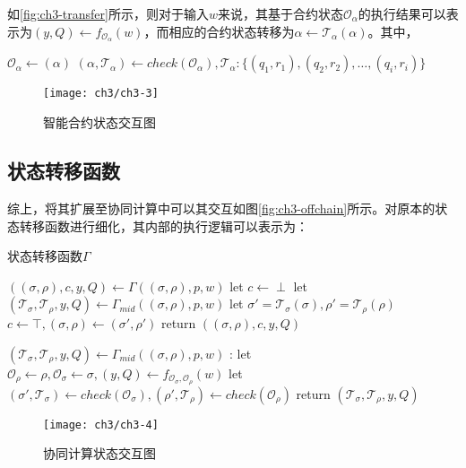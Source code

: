如\autoref{fig:ch3-transfer}所示，则对于输入$w$来说，其基于合约状态$\mathcal{O}_{\alpha}$的执行结果可以表示为$(y, Q) \leftarrow f_{\mathcal{O}_\alpha}(w)$，而相应的合约状态转移为$\alpha \leftarrow \mathcal{T}_\alpha(\alpha)$。其中，
\begin{center}
    $\mathcal{O}_{\alpha} \leftarrow (\alpha)$ \newline
    $(\alpha, \mathcal{T}_\alpha) \leftarrow check(\mathcal{O}_{\alpha}), \mathcal{T}_\alpha: \{(q_1, r_1), (q_2, r_2), \dots, (q_i, r_i)\}$
\end{center}
\begin{figure}[htbp]
    \centering
    \texttt{[image: ch3/ch3-3]}
    \caption{\label{fig:ch3-transfer}智能合约状态交互图}
\end{figure}
\subsection{状态转移函数}
综上，将其扩展至协同计算中可以其交互如图\autoref{fig:ch3-offchain}所示。对原本的状态转移函数进行细化，其内部的执行逻辑可以表示为：
\begin{breakablealgorithm}
    \caption{状态转移函数$\Gamma$}
    \label{alg:ch3-2}
    \begin{algorithmic} 
        \item [$((\sigma, \rho), c, y, Q) \leftarrow \Gamma((\sigma, \rho), p, w)$]
        \STATE let $c \leftarrow \perp$
        \STATE let $(\mathcal{T}_\sigma, \mathcal{T}_\rho, y, Q) \leftarrow \Gamma_{mid}((\sigma, \rho), p, w)$
        \STATE let $\sigma' = \mathcal{T}_\sigma(\sigma), \rho' = \mathcal{T}_\rho(\rho)$
        \STATE $c \leftarrow \top, (\sigma, \rho) \leftarrow (\sigma', \rho')$
        \ENDIF
        \STATE return $((\sigma, \rho), c, y, Q)$

        \noindent\hrulefill
        \item [$(\mathcal{T}_\sigma, \mathcal{T}_\rho, y, Q) \leftarrow \Gamma_{mid}((\sigma, \rho), p, w)$]:
        \STATE let $\mathcal{O}_{\rho} \leftarrow \rho, \mathcal{O}_{\sigma} \leftarrow \sigma, (y, Q) \leftarrow f_{\mathcal{O}_\sigma, \mathcal{O}_\rho}(w)$
        \STATE let $(\sigma', \mathcal{T}_\sigma) \leftarrow check(\mathcal{O}_\sigma), (\rho', \mathcal{T}_\rho) \leftarrow check(\mathcal{O}_\rho)$
        \STATE return $(\mathcal{T}_\sigma, \mathcal{T}_\rho, y, Q)$
    \end{algorithmic}
\end{breakablealgorithm}
\begin{figure}[htbp]
    \centering
    \texttt{[image: ch3/ch3-4]}
    \caption{\label{fig:ch3-offchain}协同计算状态交互图}
\end{figure}

